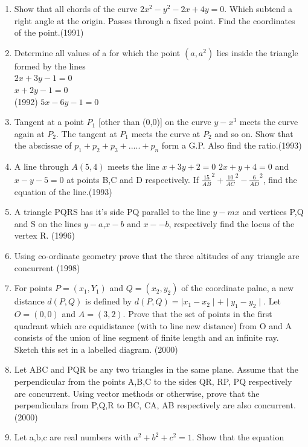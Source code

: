 \documentclass[12pt]{article}
\begin{document}
\begin{enumerate}
\newpage
\item Show that all chords of the curve  $2x^2-y^2-2x+4y=0$. Which subtend a right angle at the origin. Passes through a fixed point. Find the coordinates of the point.(1991)\\
\item Determine all values of a for which the point $(a, a^2)$ lies inside the triangle formed by the lines\\
$2x+3y-1=0$\\
$x+2y-1=0$\\       (1992)
$5x-6y-1=0$\\
\item Tangent at a point $P_1$ [other than (0,0)] on the curve $y-x^3$ meets the curve again at $P_2$. The tangent at $P_1$ meets the curve at $P_2$ and so on. Show that the abscissae of $p_1+p_2+p_3+.....+p_n$ form a G.P. Also find the ratio.(1993)\\
\item A line through $A(5,4)$ meets the line $x+3y+2=0$ $2x+y+4=0$ and $x-y-5=0$ at points B,C and D respectively. If    $\frac{15}{AB}^2+\frac{10}{AC}^2-\frac{6}{AD}^2$, find the equation of the line.(1993)\\
\item A triangle PQRS has it's side PQ parallel to the line $y-mx$ and vertices P,Q and S on the lines $y-a$,$ x-b$ and $x--b$, respectively find the locus of the vertex R. (1996)\\
\item Using co-ordinate geometry prove that the three altitudes of any triangle are concurrent (1998)\\
\item For points $P=(x_1,Y_1)$ and $Q=(x_2,y_2)$ of the coordinate palne, a new distance $d(P,Q)$ is defined by $d(P,Q)=\mid x_1-x_2\mid + \mid y_1-y_2\mid$. Let $O=(0,0)$  and $A=(3,2)$. Prove that the set of points in the first quadrant which are equidistance (with to line new distance) from O and A consists of the union of line segment of finite length and an infinite ray. Sketch this set in a labelled diagram. (2000)\\
\item Let ABC and PQR be any two triangles in the same plane. Assume that the perpendicular from the points A,B,C to the sides QR, RP, PQ respectively are concurrent. Using vector methods or otherwise, prove that the perpendiculars from P,Q,R to BC, CA, AB  respectively are also concurrent. (2000)\\
\item Let a,b,c are real numbers with $a^2+b^2+c^2=1$. Show that the equation\\ 

\end{enumerate}
\end{document}
